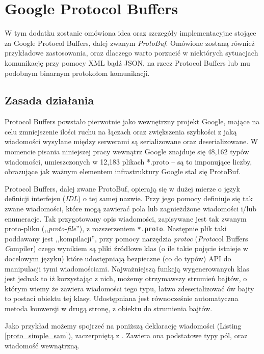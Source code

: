 \chapter{Google Protocol Buffers}
\label{cha:appendixA}
W tym dodatku zostanie omówiona idea oraz szczegóły implementacyjne stojące za Google Protocol Buffers, dalej zwanym \textit{ProtoBuf}.
Omówione zostaną również przykładowe zastosowania, oraz dlaczego warto porzucić w niektórych sytuacjach komunikację przy pomocy
XML bądź JSON, na rzecz Protocol Buffers lub mu podobnym binarnym protokołom komunikacji.

\section{Zasada działania}
\label{sec:protobuf_history}

Protocol Buffers powstało pierwotnie jako wewnętrzny projekt Google, mające na celu zmniejszenie ilości ruchu
na łączach oraz zwiększenia szybkości z jaką wiadomości wysyłane między serwerami są serializowane oraz deserializowane.
W momencie pisania niniejszej pracy wewnątrz Google znajduje się 48,162 typów wiadomości, umieszczonych w 12,183 plikach *.proto -- 
są to imponujące liczby, obrazujące jak ważnym elementem infrastruktury Google stał się ProtoBuf. \cite{protobuf}

Protocol Buffers, dalej zwane ProtoBuf, opierają się w dużej mierze o język definicji interfejsu (\textit{IDL}) o tej samej nazwie.
Przy jego pomocy definiuje się tak zwane wiadomości, które mogą zawierać pola lub zagnieżdżone wiadomości i/lub enumeracje.
Tak przygotowany opis wiadomości, zapisywane jest tak zwanym proto-pliku (,,\textit{proto-file}''), z rozszerzeniem \verb|*.proto|.
Następnie plik taki poddawany jest ,,kompilacji'', przy pomocy narzędzia \textit{protoc} (\textit{Proto}col Buffers \textit{C}ompiler) 
czego wynikiem są pliki źródłowe klas (o ile takie pojęcie istnieje w docelowym języku) które udostępniają bezpieczne (co do typów) API 
do manipulacji tymi wiadomościami. Najważniejszą funkcją wygenerowanych klas jest jednak to iż korzystając z nich, możemy otrzymawszy strumień bajtów,
o którym wiemy że zawiera wiadomości tego typu, łatwo zdeserializować ów bajty to postaci obiektu tej klasy. Udostępniana jest równocześnie automatyczna
metoda konwersji w drugą stronę, z obiektu do strumienia bajtów.

\newpage
Jako przykład możemy spojrzeć na poniższą deklarację wiadomości (Listing \ref{proto_simple_sam}),
zaczerpniętą z \cite{protobuf}. Zawiera ona podstatowe typy pól, oraz wiadomość wewnątrzną. 

